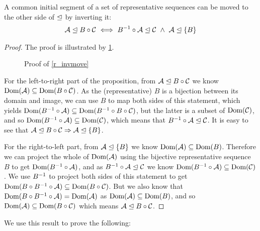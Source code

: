 \begin{mylem}\label{r_invmove}
A common initial segment of a set of representative sequences can be moved 
to the other side of $\trianglelefteq$ by inverting it:
\begin{gather*}
{\mathcal{A}}\trianglelefteq{B\circ\mathcal{C}}
\ \Longleftrightarrow \ {B^{-1}\circ\mathcal{A}}\trianglelefteq{\mathcal{C}} 
\ \wedge \  {\mathcal{A}}\trianglelefteq{\{B\}}
\end{gather*}
\end{mylem}
\begin{proof}

The proof is illustrated by \cref{fig_invmove}.

\begin{figure}[htb]

\caption{Proof of \cref{r_invmove}}\label{fig_invmove}
\end{figure}

For the left-to-right part of the proposition,
from ${\mathcal{A}}\trianglelefteq{B\circ\mathcal{C}}$ we know $\textrm{Dom}({\mathcal{A}}) \subseteq \textrm{Dom}({B\circ\mathcal{C}})$.
As the (representative) $B$ is a bijection between its domain and image,
we can use $B$ to map both sides of this statement, which yields
$\textrm{Dom}({B^{-1}\circ\mathcal{A}}) \subseteq \textrm{Dom}({B^{-1}\circ B\circ\mathcal{C}})$,
but the latter is a subset of $\textrm{Dom}({\mathcal{C}})$,
and so $\textrm{Dom}({B^{-1}\circ\mathcal{A}}) \subseteq \textrm{Dom}({\mathcal{C}})$,
which means that ${B^{-1}\circ\mathcal{A}}\trianglelefteq{\mathcal{C}}$.
It is easy to see that ${\mathcal{A}}\trianglelefteq{B\circ\mathcal{C}} \Rightarrow {\mathcal{A}}\trianglelefteq{\{B\}}$.

For the right-to-left part,
from ${\mathcal{A}}\trianglelefteq{\{B\}}$ we know $\textrm{Dom}({\mathcal{A}}) \subseteq \textrm{Dom}({B})$.
Therefore we can project the whole of $\textrm{Dom}({\mathcal{A}})$ using the bijective representative sequence $B$
to get $\textrm{Dom}({B^{-1}\circ\mathcal{A}})$, and as ${B^{-1}\circ\mathcal{A}}\trianglelefteq{\mathcal{C}}$
we know
$\textrm{Dom}({B^{-1}\circ\mathcal{A}}) \subseteq \textrm{Dom}({\mathcal{C}})$.
We use $B^{-1}$ to project both sides of this statement to get
$\textrm{Dom}({B\circ B^{-1}\circ\mathcal{A}}) \subseteq \textrm{Dom}({B\circ\mathcal{C}})$.
But we also know that $\textrm{Dom}({B\circ B^{-1}\circ\mathcal{A}}) = \textrm{Dom}({\mathcal{A}})$
as $\textrm{Dom}({\mathcal{A}}) \subseteq \textrm{Dom}({B})$,
and so $\textrm{Dom}({\mathcal{A}}) \subseteq \textrm{Dom}({B\circ\mathcal{C}})$ which means
${\mathcal{A}}\trianglelefteq{B\circ\mathcal{C}}$.
\end{proof}

We use this result to prove the following:

